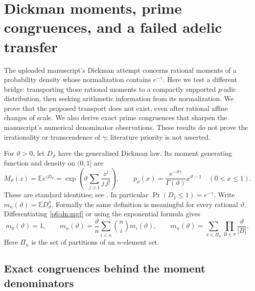 \documentclass[11pt,a4paper]{article}
\theoremstyle{definition}
\theoremstyle{remark}
\numberwithin{equation}{section}
\begin{document}
\section{Dickman moments, prime congruences, and a failed adelic transfer}
\label{p6:dn:section}

The uploaded manuscript's Dickman attempt concerns rational moments of
a probability density whose normalization contains $e^{-\gamma}$.
Here we test a different bridge: transporting those rational moments
to a compactly supported $p$-adic distribution, then seeking arithmetic
information from its normalization.  We prove that the proposed transport
does not exist, even after rational affine changes of scale.  We also
derive exact prime congruences that sharpen the manuscript's numerical
denominator observations.  These results do not prove the irrationality
or transcendence of $\gamma$; literature priority is not asserted.

For $\vartheta>0$, let $D_\vartheta$ have the generalized Dickman law.
Its moment generating function and density on $(0,1]$ are
\begin{equation}\label{p6:dn:mgf}
 M_\vartheta(z)=\mathbb E e^{zD_\vartheta}
 =\exp\left(\vartheta\sum_{j\ge1}\frac{z^j}{j\,j!}\right),
 \qquad
 p_\vartheta(x)=\frac{e^{-\vartheta\gamma}}{\Gamma(\vartheta)}
 x^{\vartheta-1}\quad(0<x\le1).
\end{equation}
These are standard identities; see \cite[\S1, (1.1)]{p6:PinskyDickman2016}.
In particular $\Pr(D_1\le1)=e^{-\gamma}$.  Write
$m_n(\vartheta)=\mathbb E D_\vartheta^n$.  Formally the same definition
is meaningful for every rational $\vartheta$.  Differentiating
\eqref{p6:dn:mgf} or using the exponential formula gives
\begin{equation}\label{p6:dn:moments}
 m_0(\vartheta)=1,\qquad
 m_n(\vartheta)=\frac{\vartheta}{n}
       \sum_{i<n}\binom ni m_i(\vartheta),\qquad
 m_n(\vartheta)=\sum_{\pi\in\Pi_n}
       \prod_{B\in\pi}\frac{\vartheta}{|B|}.
\end{equation}
Here $\Pi_n$ is the set of partitions of an $n$-element set.

\subsection{Exact congruences behind the moment denominators}
\end{document}
